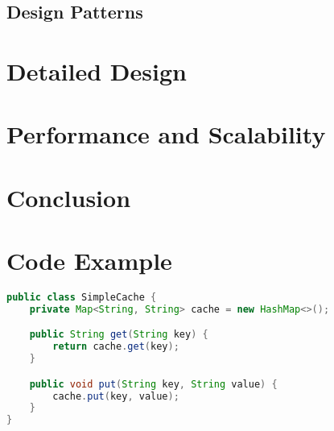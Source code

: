 \documentclass[a4paper, 11pt]{book}
\begin{document}

    \subsection{Design Patterns}
    \lipsum[4]



    \section{Detailed Design}
    \lipsum[5]



    \section{Performance and Scalability}
    \lipsum[6]



    \section{Conclusion}
    \lipsum[7]

    \newpage



    \section{Code Example}
    \begin{lstlisting}[language=Java, caption=Java Code for a Simple Cache]
public class SimpleCache {
    private Map<String, String> cache = new HashMap<>();

    public String get(String key) {
        return cache.get(key);
    }

    public void put(String key, String value) {
        cache.put(key, value);
    }
}
    \end{lstlisting}
\end{document}
